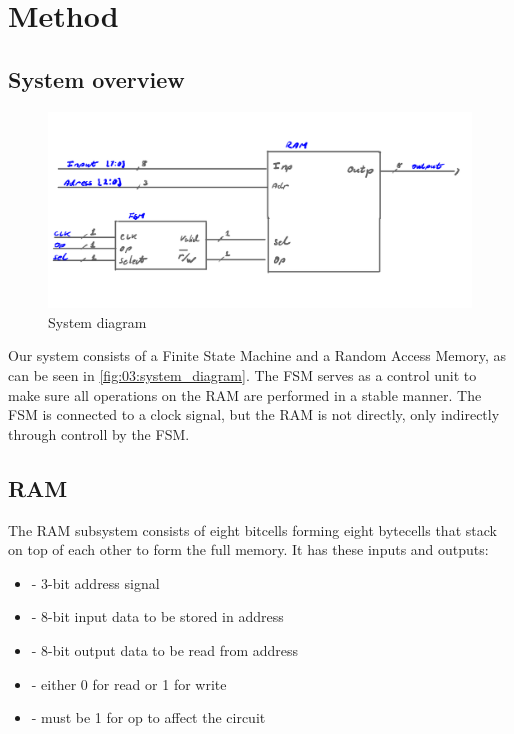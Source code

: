 \section{Method}
\subsection{System overview}

\begin{figure}
    \centering
    \includegraphics[width=0.8\linewidth]{LaTeX_2/Figures/memory_block_schematic.png}
    \caption{System diagram}
    \label{fig:03:system_diagram}
\end{figure}

Our system consists of a Finite State Machine and a Random Access Memory, as can be seen in \autoref{fig:03:system_diagram}. The FSM serves as a control unit to make sure all operations on the RAM are performed in a stable manner. The FSM is connected to a clock signal, but the RAM is not directly, only indirectly through controll by the FSM.

\subsection{RAM}
The RAM subsystem consists of eight bitcells forming eight bytecells that stack on top of each other to form the full memory. It has these inputs and outputs:
\begin{itemize}
    \item {} - 3-bit address signal
    \item {} - 8-bit input data to be stored in address
    \item {} - 8-bit output data to be read from address
    \item {} - either 0 for read or 1 for write
    \item {} - must be 1 for op to affect the circuit
\end{itemize}

